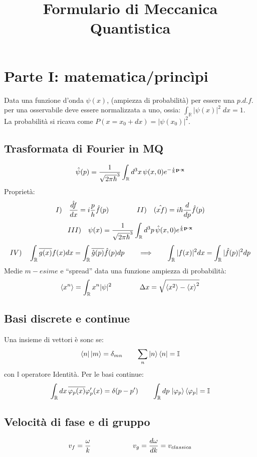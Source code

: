 

\title{Formulario di Meccanica Quantistica}
\author{}



\maketitle


\section{Parte I: matematica/princìpi}
Data una funzione d'onda $\psi(x)$, (ampiezza di probabilità) per essere una $p.d.f.$ per una osservabile deve essere normalizzata a uno,
ossia: $ \int_\mathbb{R} | \psi(x) |^2\; dx = 1 $. \\
La probabilità si ricava come $ P(x=x_0 + dx)= | \psi(x_0) |^2 $. \\
\subsection{Trasformata di Fourier in MQ}
$$
\hat{\psi}(p)= \frac{1}{\sqrt{2 \pi \hbar}^3} \int_\mathbb{R} d^3 x \, \psi(x,0) e^{-\frac{i}{\hbar} \mathbf{p}\cdot {\ensuremath{\mathbf{x}}}}$$ 
Proprietà:
$$
 I) \quad \hat{\frac{d f}{d x}} = i \frac{p}{h} \hat{f}(p)  \qquad \qquad II) \quad \hat{(xf)} = i \hbar \frac{d }{d p}\hat{f}(p)
$$
$$
III) \quad \psi(x)= \frac{1}{\sqrt{2 \pi \hbar}^3} \int_\mathbb{R} d^3 p \, \hat{\psi}(x,0) e^{\frac{i}{\hbar} \mathbf{p}\cdot {\ensuremath{\mathbf{x}}}}$$ 
$$
    IV) \quad \int_\mathbb{R} \overline{g(x)} f(x) dx =  \int_\mathbb{R} \overline{\hat{g}(p)}  \hat{f}(p) dp \qquad \Longrightarrow \qquad \int_\mathbb{R} |f(x)|^2 dx = \int_\mathbb{R} |\hat{f}(p)|^2 dp
$$
Medie $m-esime$ e ``spread'' data una funzione ampiezza di probabilità:
$$ \left< x ^{n} \right> = \int_\mathbb{R} x^n | \psi|^2 \qquad \qquad \Delta x = \sqrt{ \left< x ^{2} \right> - \left< x \right>^2}
$$ 
\subsection{Basi discrete e continue}
Una insieme di vettori è sonc se:
$$ 
 \left< n \right|\left| m \right> = \delta_{mn} \qquad \sum_n \left| n \right>\left< n \right| = \mathbb{I}
$$
con $\mathbb{I} $ operatore Identità.
Per le basi continue:
$$
\int_\mathbb{R} dx \, \overline{\varphi_p (x)} \varphi_p' (x)  = \delta(p-p') \qquad 
\int_\mathbb{R} dp \, \left| \varphi_p \right> \left< \varphi_p \right|  = \mathbb{I} 
$$

\subsection{Velocità di fase e di gruppo}
$$
v_f = \frac{\omega}{k} \qquad \qquad \qquad v_g= \frac{d \omega}{d k} = v_{classica}
$$
